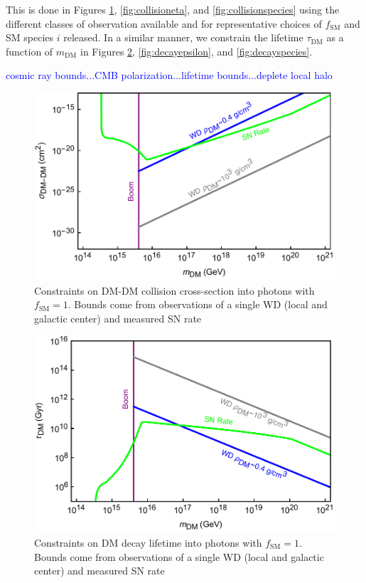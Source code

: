 \documentclass[twocolumn,showpacs,preprintnumbers,amsmath,amssymb,prd]{revtex4}
\begin{document}
This is done in Figures \ref{fig:collisionclasses}, \ref{fig:collisioneta}, and \ref{fig:collisionspecies} using the different classes of observation available and for representative choices of $f_\text{SM}$ and SM species $i$ released. 
In a similar manner, we constrain the lifetime $\tau_\text{DM}$ as a function of $m_\text{DM}$ in Figures \ref{fig:decayclasses}, \ref{fig:decayepsilon}, and \ref{fig:decayspecies}.



\textcolor{blue}{cosmic ray bounds...CMB polarization...lifetime bounds...deplete local halo}

\begin{figure}
\includegraphics[scale=.45]{collisionobservation.pdf}
\caption{Constraints on DM-DM collision cross-section into photons with $f_\text{SM} =1$. Bounds come from observations of a single WD (local and galactic center) and measured SN rate}
\label{fig:collisionclasses}
\end{figure}

\begin{figure}
\includegraphics[scale=.45]{decayobservation.pdf}
\caption{Constraints on DM decay lifetime into photons with $f_\text{SM} =1$. Bounds come from observations of a single WD (local and galactic center) and measured SN rate}
\label{fig:decayclasses}
\end{figure}
 
\end{document}
